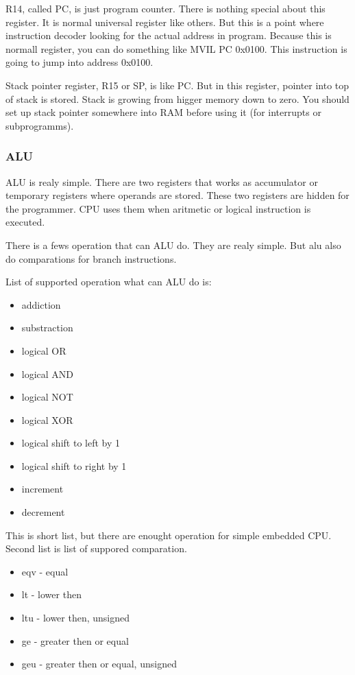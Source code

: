 R14, called PC, is just program counter. There is nothing special about
this register. It is normal universal register like others. But this is
a point where instruction decoder looking for the actual address in program.
Because this is normall register, you can do something like MVIL PC 0x0100.
This instruction is going to jump into address 0x0100. 

Stack pointer register, R15 or SP, is like PC. But in this register, pointer 
into top of stack is stored. Stack is growing from higger memory down to zero. 
You should set up stack pointer somewhere into RAM before using it (for interrupts 
or subprogramms). 

\subsubsection{ALU}

ALU is realy simple. There are two registers that works as accumulator or
temporary registers where operands are stored. These two registers are 
hidden for the programmer. CPU uses them when aritmetic or logical instruction
is executed.

There is a fews operation that can ALU do. They are realy simple. But alu
also do comparations for branch instructions. 

List of supported operation what can ALU do is:

\begin{itemize}
    \item addiction
    \item substraction
    \item logical OR
    \item logical AND
    \item logical NOT
    \item logical XOR
    \item logical shift to left by 1
    \item logical shift to right by 1
    \item increment
    \item decrement
\end{itemize}

This is short list, but there are enought operation for simple embedded CPU.
Second list is list of suppored comparation. 

\begin{itemize}
    \item eqv - equal
    \item lt - lower then
    \item ltu - lower then, unsigned
    \item ge - greater then or equal
    \item geu - greater then or equal, unsigned
\end{itemize}

